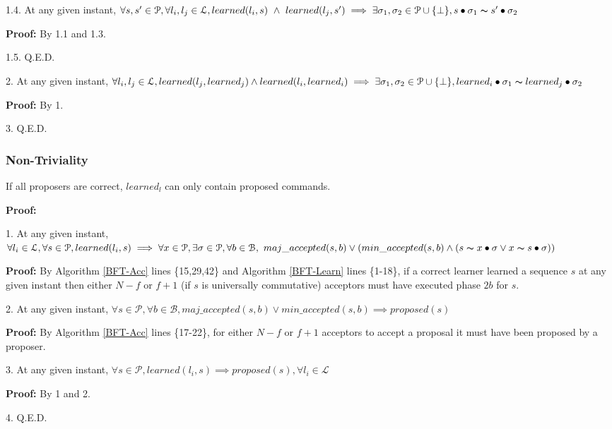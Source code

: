 \indent\indent\indent\parbox{\linewidth-\algorithmicindent*3}{\strut1.4. At any given instant, $\forall s,s' \in \mathcal{P}, \forall l_i,l_j \in \mathcal{L}, learned(l_i,s)\ \land\ learned(l_j,s') \implies \exists \sigma_1,\sigma_2 \in \mathcal{P} \cup \{\bot\}, s \bullet \sigma_1 \thicksim s' \bullet \sigma_2$ }\par
\indent\indent\indent\indent\parbox{\linewidth}{\strut\textbf{Proof:} By 1.1 and 1.3.}\par
\indent\indent\indent\parbox{\linewidth}{\strut1.5. Q.E.D. }\par
\parbox{\linewidth-\algorithmicindent*3}{\strut2. At any given instant, $\forall l_i,l_j \in \mathcal{L}, learned(l_j,learned_j) \land learned(l_i,learned_i) \implies \exists \sigma_1,\sigma_2 \in \mathcal{P} \cup \{\bot\}, learned_i \bullet \sigma_1 \thicksim learned_j \bullet \sigma_2$}\par
\indent\indent\parbox{\linewidth}{\strut\textbf{Proof:} By 1.}\par
\parbox{\linewidth}{\strut3. Q.E.D.} \par

\subsubsection{Non-Triviality}
\begin{theorem}
If all proposers are correct, $learned_l$ can only contain proposed commands. \label{N-T1} \par
\end{theorem} 
\textbf{Proof:} \par
\parbox{\linewidth}{\strut1. At any given instant, $\forall l_i \in \mathcal{L}, \forall s \in \mathcal{P}, learned(l_i,s) \implies \forall x \in \mathcal{P}, \exists \sigma \in \mathcal{P}, \forall b \in \mathcal{B}, \ maj\_accepted(s,b) \lor (min\_accepted(s,b) \land  (s \thicksim x \bullet \sigma \lor x \thicksim s \bullet \sigma))$ }\par
\indent\indent\parbox{\linewidth}{\strut\textbf{Proof:} By Algorithm \ref{BFT-Acc} lines \{15,29,42\} and Algorithm \ref{BFT-Learn} lines \{1-18\}, if a correct learner learned a sequence $s$ at any given instant then either $N-f$ or $f+1$ (if $s$ is universally commutative) acceptors must have executed phase $2b$ for $s$.}\par
\parbox{\linewidth}{\strut2. At any given instant, $\forall s \in \mathcal{P}, \forall b \in \mathcal{B}, maj\_accepted(s,b) \lor min\_accepted(s,b) \implies proposed(s)$ }\par
\indent\indent\parbox{\linewidth}{\strut\textbf{Proof:} By Algorithm \ref{BFT-Acc} lines \{17-22\}, for either $N-f$ or $f+1$ acceptors to accept a proposal it must have been proposed by a proposer.}\par
\parbox{\linewidth}{\strut3. At any given instant, $\forall s \in \mathcal{P}, learned(l_i,s) \implies proposed(s),\forall l_i \in \mathcal{L}$}\par
\indent\indent\parbox{\linewidth}{\strut\textbf{Proof:} By 1 and 2.}\par
\parbox{\linewidth}{\strut4. Q.E.D.}\par

